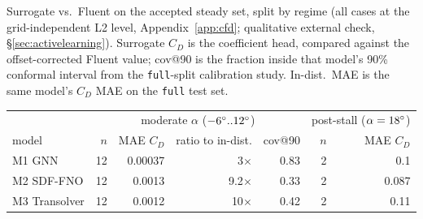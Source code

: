\caption{Surrogate vs.\ Fluent on the accepted steady set, split by regime (all cases at the grid-independent L2 level, Appendix~\ref{app:cfd}; qualitative external check, \S\ref{sec:activelearning}). Surrogate $C_D$ is the coefficient head, compared against the offset-corrected Fluent value; cov@90 is the fraction inside that model's 90\% conformal interval from the \texttt{full}-split calibration study. In-dist.\ MAE is the same model's $C_D$ MAE on the \texttt{full} test set.}
\label{tab:fluent_verify}
\providecommand{\tblfont}{\footnotesize}%
\tblfont
\setlength{\tabcolsep}{4pt}
\begin{tabular}{lrrrrrr}
\toprule
& \multicolumn{4}{c}{moderate $\alpha$ ($-6^{\circ}..12^{\circ}$)} & \multicolumn{2}{c}{post-stall ($\alpha=18^{\circ}$)} \\
\cmidrule(lr){2-5}\cmidrule(lr){6-7}
model & $n$ & MAE $C_D$ & ratio to in-dist. & cov@90 & $n$ & MAE $C_D$ \\
\midrule
M1 GNN & 12 & 0.00037 & 3$\times$ & 0.83 & 2 & 0.1 \\
M2 SDF-FNO & 12 & 0.0013 & 9.2$\times$ & 0.33 & 2 & 0.087 \\
M3 Transolver & 12 & 0.0012 & 10$\times$ & 0.42 & 2 & 0.11 \\
\bottomrule
\end{tabular}
